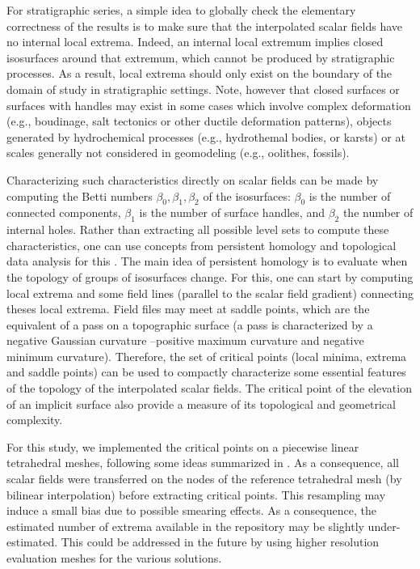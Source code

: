\documentclass[preprint]{ring20}
\begin{document}
{For stratigraphic series, a simple idea to globally check the elementary correctness of the results is to make sure that the interpolated scalar fields have no internal local extrema. Indeed, an internal local extremum implies closed isosurfaces around that extremum, which cannot be produced by stratigraphic processes. As a result, local extrema should only exist on the boundary of the domain of study in stratigraphic settings. Note, however that closed surfaces or surfaces with handles may exist in some cases which involve complex deformation (e.g., boudinage, salt tectonics or other ductile deformation patterns), objects generated by hydrochemical processes (e.g., hydrothemal bodies, or karsts) or at scales generally not considered in geomodeling (e.g., oolithes, fossils). 

Characterizing such characteristics directly on scalar fields can be made by computing the Betti numbers $\beta_0, \beta_1, \beta_2$ of the isosurfaces: $\beta_0$ is the number of connected components, $\beta_1$ is the number of surface handles, and $\beta_2$ the number of internal holes. Rather than extracting all possible level sets to compute these characteristics, one can use concepts from persistent homology and topological data analysis for this \citep[e.g.,][]{Chazal2017ACMS,Tierny2017,Wasserman2018}. The main idea of persistent homology is to evaluate when the topology of groups of isosurfaces change. For this, one can start by computing local extrema and some field lines (parallel to the scalar field gradient) connecting theses local extrema. Field files may meet at saddle points, which are the equivalent of a pass on a topographic surface (a pass is characterized by a negative Gaussian curvature --positive maximum curvature and negative minimum curvature). Therefore, the set of critical points (local minima, extrema and saddle points) can be used to compactly characterize some essential features of the topology of the interpolated scalar fields. The critical point of the elevation of an implicit surface also provide a measure of its topological and geometrical complexity. 

For this study, we implemented the critical points on a piecewise linear tetrahedral meshes, following some ideas summarized in \citet{Tierny2017}. As a consequence, all scalar fields were transferred on the nodes of the reference tetrahedral mesh (by bilinear interpolation) before extracting critical points. This resampling may induce a small bias due to possible smearing effects. As a consequence, the estimated number of extrema available in the repository may be slightly under-estimated. 
This could be addressed in the future by using higher resolution evaluation meshes for the various solutions. 

}
\end{document}

